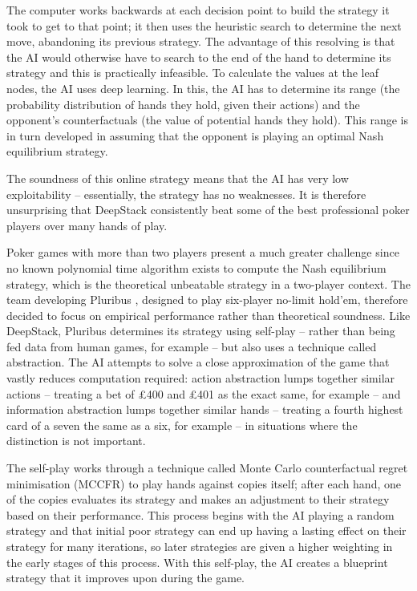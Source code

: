 \documentclass{article}
\begin{document}
\begin{multicols*}{2}
The computer works backwards at each decision point to build the strategy it took to get to that point; it then uses the heuristic search to determine the next move, abandoning its previous strategy. The advantage of this resolving is that the AI would otherwise have to search to the end of the hand to determine its strategy and this is practically infeasible. To calculate the values at the leaf nodes, the AI uses deep learning. In this, the AI has to determine its range (the probability distribution of hands they hold, given their actions) and the opponent’s counterfactuals (the value of potential hands they hold). This range is in turn developed in assuming that the opponent is playing an optimal Nash equilibrium strategy.
\newline

The soundness of this online strategy means that the AI has very low exploitability – essentially, the strategy has no weaknesses. It is therefore unsurprising that DeepStack consistently beat some of the best professional poker players over many hands of play.
\newline

Poker games with more than two players present a much greater challenge since no known polynomial time algorithm exists to compute the Nash equilibrium strategy, which is the theoretical unbeatable strategy in a two-player context. The team developing Pluribus \cite{Pluribus}, designed to play six-player no-limit hold’em, therefore decided to focus on empirical performance rather than theoretical soundness. Like DeepStack, Pluribus determines its strategy using self-play – rather than being fed data from human games, for example – but also uses a technique called abstraction. The AI attempts to solve a close approximation of the game that vastly reduces computation required: action abstraction lumps together similar actions – treating a bet of £400 and £401 as the exact same, for example – and information abstraction lumps together similar hands – treating a fourth highest card of a seven the same as a six, for example – in situations where the distinction is not important.
\newline

The self-play works through a technique called Monte Carlo counterfactual regret minimisation (MCCFR) to play hands against copies itself; after each hand, one of the copies evaluates its strategy and makes an adjustment to their strategy based on their performance. This process begins with the AI playing a random strategy and that initial poor strategy can end up having a lasting effect on their strategy for many iterations, so later strategies are given a higher weighting in the early stages of this process. With this self-play, the AI creates a blueprint strategy that it improves upon during the game.
\newline


\end{multicols*}
\end{document}
